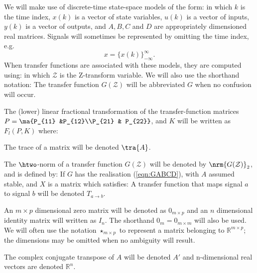 \label{sec:notation}
We will make use of discrete-time state-space models of the form:
in which $k$ is the time index, $x(k)$ is a vector of state variables, $u(k)$ is a vector of inputs, $y(k)$ is a vector of outputs, and $A,B,C$ and $D$ are appropriately dimensioned real matrices. Signals will sometimes be represented by omitting the time index, e.g.
$$x=\{x(k)\}^{\infty}_{-\infty}.$$
When transfer functions are associated with these models, they are computed using:
in which $\mathcal{Z}$ is the Z-transform variable. We will also use the shorthand notation:
The transfer function $G(\mathcal{Z})$ will be abbreviated $G$ when no confusion will occur.

The (lower) linear fractional transformation of the transfer-function matrices $P=\ma{P_{11} &P_{12}\\P_{21} & P_{22}}$, and $K$ will be written as $F_l(P,K)$ where: 

The trace of a matrix will be denoted $\tra{A}$.
 
The $\htwo$-norm of a transfer function $G(\mathcal{Z})$ will be denoted by $\nrm{G(\z)}_2$, and is defined by:
If $G$ has the realisation (\ref{eqn:GABCD}), with $A$ assumed stable, and $X$ is a matrix which satisfies:
%
A transfer function that maps signal $a$ to signal $b$ will be denoted $T_{a\rightarrow b}$.

An $m\times p$ dimensional zero matrix will be denoted as $0_{m\times p}$ and an $n$ dimensional identity matrix will written as $I_n$. The shorthand $0_m=0_{m\times m}$ will also be used. We will often use the notation $\star_{m\times p}$ to represent a matrix belonging to $\mathbb R^{m\times p}$; the dimensions may be omitted when no ambiguity will result.

The complex conjugate transpose of $A$ will be denoted $A'$ and n-dimensional real vectors are denoted $\mathbb{R}^n$.


